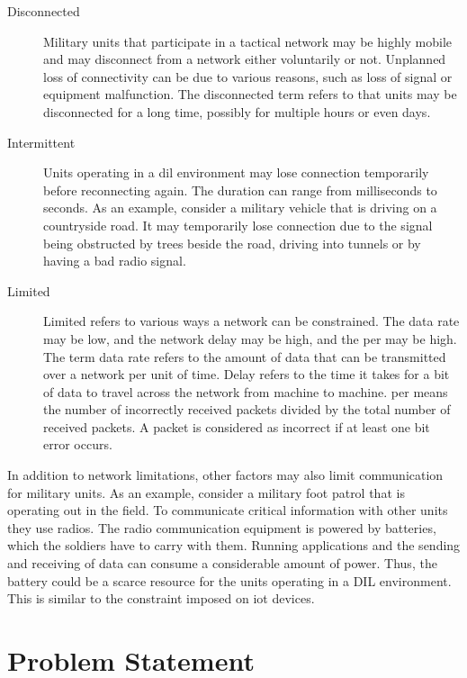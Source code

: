 \begin{description}
\item[Disconnected]

Military units that participate in a tactical network may be highly mobile and
may disconnect from a network either voluntarily or not. Unplanned loss of
connectivity can be due to various reasons, such as loss of signal or equipment
malfunction.  The disconnected term refers to that units may be disconnected for
a long time, possibly for multiple hours or even days.

\item[Intermittent]

Units operating in a \gls{dil} environment may lose connection temporarily
before reconnecting again. The duration can range from milliseconds to seconds.
As an example, consider a military vehicle that is driving on a countryside
road. It may temporarily lose connection due to the signal being obstructed by
trees beside the road, driving into tunnels or by having a bad radio signal.

\item[Limited] Limited refers to various ways a network can be constrained. The
data rate may be low, and the network delay may be high, and the \gls{per} may be
high. The term data rate refers to the amount of data that can be transmitted
over a network per unit of time. Delay refers to the time it takes for a bit of
data to travel across the network from machine to machine. \gls{per} means the
number of incorrectly received packets divided by the total number of received
packets. A packet is considered as incorrect if at least one bit error occurs.


\end{description}

In addition to network limitations, other factors may also limit communication
for military units. As an example, consider a military foot patrol that is
operating out in the field. To communicate critical information with other units
they use radios. The radio communication equipment is powered by batteries,
which the soldiers have to carry with them. Running applications and the sending
and receiving of data can consume a considerable amount of power. Thus, the
battery could be a scarce resource for the units operating in a DIL environment.
This is similar to the constraint imposed on \gls{iot} devices.


\section{Problem Statement}
\label{section:problem-statement}

